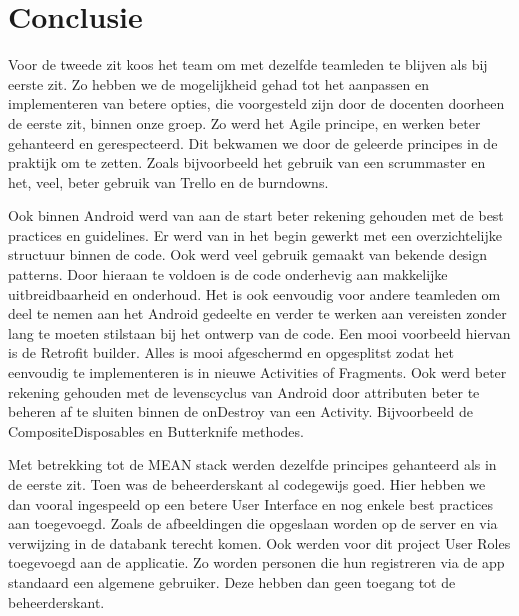 
\chapter{Conclusie}
\label{ch:conclusie}

Voor de tweede zit koos het team om met dezelfde teamleden te blijven als bij eerste zit. Zo hebben we de mogelijkheid gehad tot het aanpassen en implementeren van betere opties, die voorgesteld zijn door de docenten doorheen de eerste zit, binnen onze groep. Zo werd het Agile principe, en werken beter gehanteerd en gerespecteerd. Dit bekwamen we door de geleerde principes in de praktijk om te zetten. Zoals bijvoorbeeld het gebruik van een scrummaster en het, veel, beter gebruik van Trello en de burndowns.

Ook binnen Android werd van aan de start beter rekening gehouden met de best practices en guidelines. Er werd van in het begin gewerkt met een overzichtelijke structuur binnen de code. Ook werd veel gebruik gemaakt van bekende design patterns. Door hieraan te voldoen is de code onderhevig aan makkelijke uitbreidbaarheid en onderhoud. Het is ook eenvoudig voor andere teamleden om deel te nemen aan het Android gedeelte en verder te werken aan vereisten zonder lang te moeten stilstaan bij het ontwerp van de code. Een mooi voorbeeld hiervan is de Retrofit builder. Alles is mooi afgeschermd en opgesplitst zodat het eenvoudig te implementeren is in nieuwe Activities of Fragments. Ook werd beter rekening gehouden met de levenscyclus van Android door attributen beter te beheren af te sluiten binnen de onDestroy van een Activity. Bijvoorbeeld de CompositeDisposables en Butterknife methodes.

Met betrekking tot de MEAN stack werden dezelfde principes gehanteerd als in de eerste zit. Toen was de beheerderskant al codegewijs goed. Hier hebben we dan vooral ingespeeld op een betere User Interface en nog enkele best practices aan toegevoegd. Zoals de afbeeldingen die opgeslaan worden op de server en via verwijzing in de databank terecht komen. Ook werden voor dit project User Roles toegevoegd aan de applicatie. Zo worden personen die hun registreren via de app standaard een algemene gebruiker. Deze hebben dan geen toegang tot de beheerderskant.